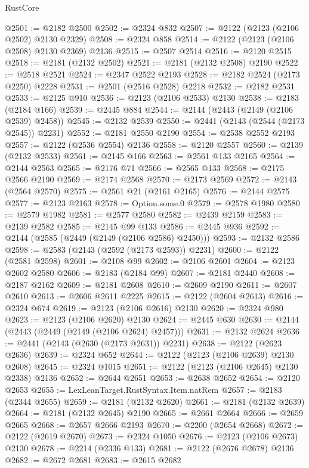 \begin{lexlean}{RustCore}
\begin{coremodule}
@2501 := @2182 @2500
@2502 := @2324 @832
@2507 := @2122 (@2123 (@2106 @2502) @2130 @2329)
@2508 := @2324 @858
@2514 := @2122 (@2123 (@2106 @2508) @2130 @2369) @2136
@2515 := @2507 @2514
@2516 := @2120 @2515
@2518 := @2181 (@2132 @2502)
@2521 := @2181 (@2132 @2508) @2190
@2522 := @2518 @2521
@2524 := @2347 @2522 @2193
@2528 := @2182 @2524 (@2173 @2250) @2228
@2531 := @2501 (@2516 @2528) @2218
@2532 := @2182 @2531
@2533 := @2125 @910
@2536 := @2123 (@2106 @2533) @2130
@2538 := @2183 (@2184 @166)
@2539 := @2445 @884
@2544 := @2144 (@2443 (@2149 (@2106 @2539) @2458))
@2545 := @2132 @2539
@2550 := @2441 (@2143 (@2544 (@2173 @2545)) @2231)
@2552 := @2181 @2550 @2190
@2554 := @2538 @2552 @2193
@2557 := @2122 (@2536 @2554) @2136
@2558 := @2120 @2557
@2560 := @2139 (@2132 @2533)
@2561 := @2145 @166
@2563 := @2561 @133 @2165
@2564 := @2144 @2563
@2565 := @2176 @71
@2566 := @2565 @133
@2568 := @2175 @2566 @2190
@2569 := @2174 @2568
@2570 := @2173 @2569
@2572 := @2143 (@2564 @2570)
@2575 := @2561 @21 (@2161 @2165)
@2576 := @2144 @2575
@2577 := @2123 @2163
@2578 := Option.some.{0}
@2579 := @2578 @1980
@2580 := @2579 @1982
@2581 := @2577 @2580
@2582 := @2439 @2159
@2583 := @2139 @2582
@2585 := @2145 @99 @133
@2586 := @2445 @936
@2592 := @2144 (@2585 (@2449 (@2149 (@2106 @2586) @2450)))
@2593 := @2132 @2586
@2598 := @2583 (@2143 (@2592 (@2173 @2593)) @2231)
@2600 := @2122 (@2581 @2598)
@2601 := @2108 @99
@2602 := @2106 @2601
@2604 := @2123 @2602 @2580
@2606 := @2183 (@2184 @99)
@2607 := @2181 @2440
@2608 := @2187 @2162
@2609 := @2181 @2608
@2610 := @2609 @2190
@2611 := @2607 @2610
@2613 := @2606 @2611 @2225
@2615 := @2122 (@2604 @2613)
@2616 := @2324 @674
@2619 := @2123 (@2106 @2616) @2130
@2620 := @2324 @980
@2623 := @2123 (@2106 @2620) @2130
@2624 := @2445 @630
@2630 := @2144 (@2443 (@2449 (@2149 (@2106 @2624) @2457)))
@2631 := @2132 @2624
@2636 := @2441 (@2143 (@2630 (@2173 @2631)) @2231)
@2638 := @2122 (@2623 @2636)
@2639 := @2324 @652
@2644 := @2122 (@2123 (@2106 @2639) @2130 @2608)
@2645 := @2324 @1015
@2651 := @2122 (@2123 (@2106 @2645) @2130 @2338) @2136
@2652 := @2644 @2651
@2653 := @2638 @2652
@2654 := @2120 @2653
@2655 := LexLeanTarget.RustSyntax.Item.natRem
@2657 := @2183 (@2344 @2655)
@2659 := @2181 (@2132 @2620)
@2661 := @2181 (@2132 @2639)
@2664 := @2181 (@2132 @2645) @2190
@2665 := @2661 @2664
@2666 := @2659 @2665
@2668 := @2657 @2666 @2193
@2670 := @2200 (@2654 @2668)
@2672 := @2122 (@2619 @2670)
@2673 := @2324 @1050
@2676 := @2123 (@2106 @2673) @2130
@2678 := @2214 (@2336 @133)
@2681 := @2122 (@2676 @2678) @2136
@2682 := @2672 @2681
@2683 := @2615 @2682

\end{coremodule}
\end{lexlean}
